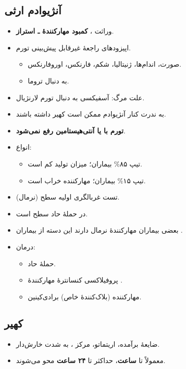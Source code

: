 \documentclass[12pt,a4paper]{article}
\begin{document}
\subsection*{آنژیوادم ارثی }
\begin{itemize}
  \item وراثت \textbf{}، \textbf{کمبود مهارکنندهٔ  ـ استراز}.
  \item اپیزودهای راجعهٔ غیرقابل پیش‌بینی تورم.
  \begin{itemize}
    \item صورت، اندام‌ها، ژنیتالیا، شکم، فارنکس، اوروفارنکس.
    \item به دنبال تروما.
  \end{itemize}
  \item علت مرگ: آسفیکسی به دنبال تورم لارنژیال.
  \item به ندرت کنار آنژیوادم ممکن است کهیر داشته باشند.
  \item \textbf{تورم با  یا آنتی‌هیستامین رفع نمی‌شود}.
  \item انواع:
  \begin{itemize}
    \item تیپ  \ANarrow{} ۸۵\% بیماران؛ میزان \ANdeleted{} تولید کم است.
    \item تیپ  \ANarrow{} ۱۵\% بیماران؛ مهارکننده خراب است.
  \end{itemize}
  \item تست غربالگری اولیه \ANarrow{} سطح 
  \lr{\(\downarrow\)} (نرمال).
  \item در حملهٔ حاد  \ANarrow{} سطح 
  \lr{\(\downarrow\)} است.
  \item بعضی بیماران مهارکنندهٔ نرمال دارند \ANarrow{}
  این دسته از بیماران .
  \item درمان:
  \begin{itemize}
    \item حملهٔ حاد.
    \item پروفیلاکسی \ANarrow{} کنسانترهٔ مهارکنندهٔ .
    \item مهارکننده (بلاک‌کنندهٔ خاص) برادی‌کینین.
  \end{itemize}
\end{itemize}

\subsection*{کهیر}
\begin{itemize}
  \item ضایعهٔ برآمده، اریتماتو، مرکز ، به شدت خارش‌دار.
  \item معمولاً تا \textbf{ ساعت}، حداکثر تا
  \textbf{۲۴ ساعت} محو می‌شوند.
\end{itemize}
\end{document}
